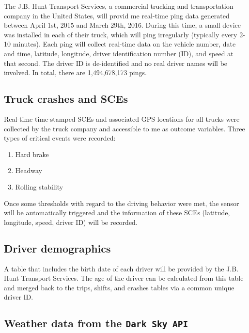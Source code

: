 \documentclass[12pt]{book}
\numberwithin{equation}{chapter}
\providecommand{\tightlist}{%
  \setlength{\itemsep}{0pt}\setlength{\parskip}{0pt}}
\begin{document}
The J.B. Hunt Transport Services, a commercial trucking and transportation company in the United States, will provid me real-time ping data generated between April 1st, 2015 and March 29th, 2016. During this time, a small device was installed in each of their truck, which will ping irregularly (typically every 2-10 minutes). Each ping will collect real-time data on the vehicle number, date and time, latitude, longitude, driver identification number (ID), and speed at that second. The driver ID is de-identified and no real driver names will be involved. In total, there are 1,494,678,173 pings.

\hypertarget{truck-crashes-and-sces}{%
\subsection{Truck crashes and SCEs}\label{truck-crashes-and-sces}}

Real-time time-stamped SCEs and associated GPS locations for all trucks were collected by the truck company and accessible to me as outcome variables. Three types of critical events were recorded:

\begin{enumerate}
\def\labelenumi{\arabic{enumi}.}
\tightlist
\item
  Hard brake
\item
  Headway
\item
  Rolling stability
\end{enumerate}

Once some thresholds with regard to the driving behavior were met, the sensor will be automatically triggered and the information of these SCEs (latitude, longitude, speed, driver ID) will be recorded.

\hypertarget{driver-demographics}{%
\subsection{Driver demographics}\label{driver-demographics}}

A table that includes the birth date of each driver will be provided by the J.B. Hunt Transport Services. The age of the driver can be calculated from this table and merged back to the trips, shifts, and crashes tables via a common unique driver ID.

\hypertarget{weather-data-from-the-dark-sky-api}{%
\subsection{\texorpdfstring{Weather data from the \texttt{Dark\ Sky\ API}}{Weather data from the Dark Sky API}}\label{weather-data-from-the-dark-sky-api}}
\end{document}
